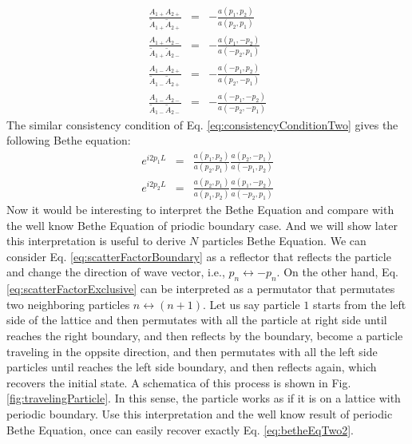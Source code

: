 \documentclass[12pt,a4paper]{article}
\begin{document}
\begin{subequations}
    \label{eq:scatterFactorExclusive2}
    \begin{eqnarray}
        \frac{A_{1+}A_{2+}}{\tilde{A}_{1+}\tilde{A}_{2+}} & = & 
        -\frac{a(p_1, p_2)}{a(p_2, p_1)} \\
        \frac{A_{1+}A_{2-}}{\tilde{A}_{1+}\tilde{A}_{2-}} & = & 
        -\frac{a(p_1, -p_2)}{a(-p_2, p_1)} \\
        \frac{A_{1-}A_{2+}}{\tilde{A}_{1-}\tilde{A}_{2+}} & = & 
        -\frac{a(-p_1, p_2)}{a(p_2, -p_1)} \\
        \frac{A_{1-}A_{2-}}{\tilde{A}_{1-}\tilde{A}_{2-}} & = & 
        -\frac{a(-p_1, -p_2)}{a(-p_2, -p_1)}
    \end{eqnarray}
\end{subequations}
The similar consistency condition of Eq. \eqref{eq:consistencyConditionTwo}
gives the following Bethe equation:
\begin{subequations}
    \label{eq:betheEqTwo2}
    \begin{eqnarray}
        e^{i2p_1L} & = & \frac{a(p_1, p_2)}{a(p_2, p_1)} 
        \frac{a(p_2, -p_1)}{a(-p_1, p_2)}\\
        e^{i2p_2L} & = & \frac{a(p_2, p_1)}{a(p_1, p_2)} 
        \frac{a(p_1, -p_2)}{a(-p_2, p_1)}
    \end{eqnarray}
\end{subequations}
Now it would be interesting to interpret the Bethe Equation and compare with
the well know Bethe Equation of priodic boundary case. And we will show later
this interpretation is useful to derive $N$ particles Bethe Equation. We can
consider Eq.  \eqref{eq:scatterFactorBoundary} as a reflector that reflects the
particle and change the direction of wave vector, i.e., $p_n\leftrightarrow-p_n$.
On the other hand, Eq. \eqref{eq:scatterFactorExclusive} can be interpreted as
a permutator that permutates two neighboring particles $n\leftrightarrow (n+1)$.
Let us say particle $1$ starts from the left side of the lattice and then
permutates with all the particle at right side until reaches the right boundary,
and then reflects by the boundary, become a particle traveling in the oppsite
direction, and then permutates with all the left side particles until reaches
the left side boundary, and then reflects again, which recovers the initial
state. A schematica of this process is shown in Fig.
\ref{fig:travelingParticle}. In this sense, the particle works as if it is on a
lattice with periodic boundary. Use this interpretation and the well know result
of periodic Bethe Equation, once can easily recover exactly Eq.
\eqref{eq:betheEqTwo2}. 
\end{document}
